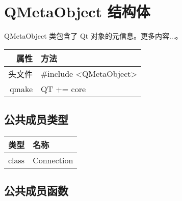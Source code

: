 \chapter{QMetaObject 结构体}

QMetaObject 类包含了 Qt 对象的元信息。更多内容...。

\begin{tabular}{|r|l|}
	\hline
	属性 & 方法 \\
	\hline
	头文件 & \#include <QMetaObject>\\      
	\hline
	qmake & QT += core\\      
	\hline
\end{tabular}

\section{公共成员类型}


\begin{tabular}{|r|l|}   
\hline
类型	& 名称 \\ 
\hline
class	& Connection \\ 
\hline
\end{tabular}


\section{公共成员函数}

